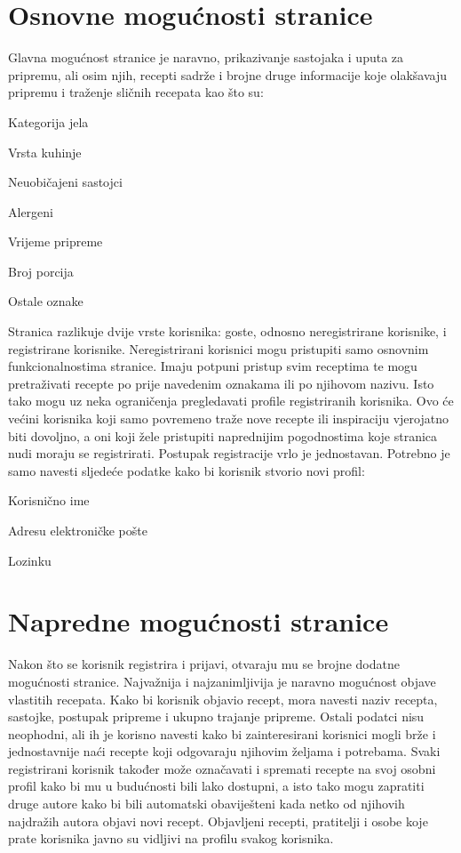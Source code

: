 		\section{Osnovne mogućnosti stranice}
		Glavna mogućnost stranice je naravno, prikazivanje sastojaka i uputa za pripremu, ali osim njih, recepti sadrže i brojne druge informacije koje olakšavaju pripremu i traženje sličnih recepata kao što su:
		\begin{packed_item}
			\item Kategorija jela
			\item Vrsta kuhinje
			\item Neuobičajeni sastojci
			\item Alergeni
			\item Vrijeme pripreme
			\item Broj porcija
			\item Ostale oznake
		\end{packed_item}
		Stranica razlikuje dvije vrste korisnika: goste, odnosno neregistrirane korisnike, i registrirane korisnike. Neregistrirani korisnici mogu pristupiti samo osnovnim funkcionalnostima stranice. Imaju potpuni pristup svim receptima te mogu pretraživati recepte po prije navedenim oznakama ili po njihovom nazivu. Isto tako mogu uz neka ograničenja pregledavati profile registriranih korisnika. Ovo će većini korisnika koji samo povremeno traže nove recepte ili inspiraciju vjerojatno biti dovoljno, a oni koji žele pristupiti naprednijim pogodnostima koje stranica nudi moraju se registrirati.
		\linebreak
		Postupak registracije vrlo je jednostavan. Potrebno je samo navesti sljedeće podatke kako bi korisnik stvorio novi profil:
		\begin{packed_item}
			\item Korisnično ime
			\item Adresu elektroničke pošte
			\item Lozinku
		\end{packed_item}
		\pagebreak
		\section{Napredne mogućnosti stranice}
		Nakon što se korisnik registrira i prijavi, otvaraju mu se brojne dodatne mogućnosti stranice. Najvažnija i najzanimljivija je naravno mogućnost objave vlastitih recepata. Kako bi korisnik objavio recept, mora navesti naziv recepta, sastojke, postupak pripreme i ukupno trajanje pripreme. Ostali podatci nisu neophodni, ali ih je korisno navesti kako bi zainteresirani korisnici mogli brže i jednostavnije naći recepte koji odgovaraju njihovim željama i potrebama.
		\linebreak
		\linebreak
		Svaki registrirani korisnik također može označavati i spremati recepte na svoj osobni profil kako bi mu u budućnosti bili lako dostupni, a isto tako mogu zapratiti druge autore kako bi bili automatski obaviješteni kada netko od njihovih najdražih autora objavi novi recept.
		Objavljeni recepti, pratitelji i osobe koje prate korisnika javno su vidljivi na profilu svakog korisnika.
